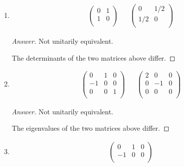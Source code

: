 \documentclass[../psets.tex]{subfiles}
\begin{document}
\begin{enumerate}[label={\textbf{6.\arabic*.}}]
\begin{enumerate}
\begin{proof}[Answer]
            Not unitarily equivalent.\par
            The traces of the two matrices above differ.
        \end{proof}
        \item 
        \begin{align*}
            \begin{pmatrix}
                0 & 1\\
                1 & 0\\
            \end{pmatrix}&&
            \begin{pmatrix}
                0 & 1/2\\
                1/2 & 0\\
            \end{pmatrix}
        \end{align*}
        \begin{proof}[Answer]
            Not unitarily equivalent.\par
            The determinants of the two matrices above differ.
        \end{proof}
        \item 
        \begin{align*}
            \begin{pmatrix}
                0 & 1 & 0\\
                -1 & 0 & 0\\
                0 & 0 & 1\\
            \end{pmatrix}&&
            \begin{pmatrix}
                2 & 0 & 0\\
                0 & -1 & 0\\
                0 & 0 & 0\\
            \end{pmatrix}
        \end{align*}
        \begin{proof}[Answer]
            Not unitarily equivalent.\par
            The eigenvalues of the two matrices above differ.
        \end{proof}
        \item 
        \begin{align*}
            \begin{pmatrix}
                0 & 1 & 0\\
                -1 & 0 & 0\\

\end{pmatrix}
\end{align*}
\end{enumerate}
\end{enumerate}
\end{document}
